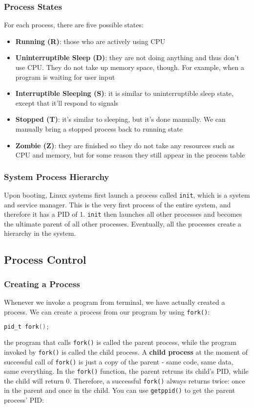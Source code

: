 \documentclass{article}
\newcommand{\bold}[1]{\textbf{#1}}
\renewcommand{\b}{\item[$\circ$]}
\newcommand{\newlist}{\begin{itemize}}
\renewcommand{\endlist}{\end{itemize}}
\newcommand{\code}[1]{\texttt{#1}}
\begin{document}
\subsubsection{Process States}

For each process, there are five possible states:

\newlist
\b \bold{Running (R)}: those who are actively using CPU
\b \bold{Uninterruptible Sleep (D)}: they are not doing anything and thus don't use CPU. They do not take up memory space, though. For example, when a program is waiting for user input
\b \bold{Interruptible Sleeping (S)}: it is similar to uninterruptible sleep state, except that it'll respond to signals
\b \bold{Stopped (T)}: it's similar to sleeping, but it's done manually. We can manually bring a stopped process back to running state
\b \bold{Zombie (Z)}: they are finished so they do not take any resources such as CPU and memory, but for some reason they still appear in the process table
\endlist

\subsubsection{System Process Hierarchy}

Upon booting, Linux systems first launch a process called \code{init}, which is a system and service manager. This is the very first process of the entire system, and therefore it has a PID of 1. \code{init} then launches all other processes and becomes the ultimate parent of all other processes. Eventually, all the processes create a hierarchy in the system. 

\subsection{Process Control}

\subsubsection{Creating a Process}

Whenever we invoke a program from terminal, we have actually created a process. We can create a process from our program by using \code{fork()}: 

\begin{lstlisting}[language=c]
pid_t fork();
\end{lstlisting}

the program that calls \code{fork()} is called the parent process, while the program invoked by \code{fork()} is called the child process. A \bold{child process} at the moment of successful call of \code{fork()} is just a copy of the parent - same code, same data, same everything. In the \code{fork()} function, the parent retruns its child's PID, while the child will return 0. Therefore, a successful \code{fork()} always returns twice: once in the parent and once in the child. You can use \code{getppid()} to get the parent process' PID: 
\end{document}
